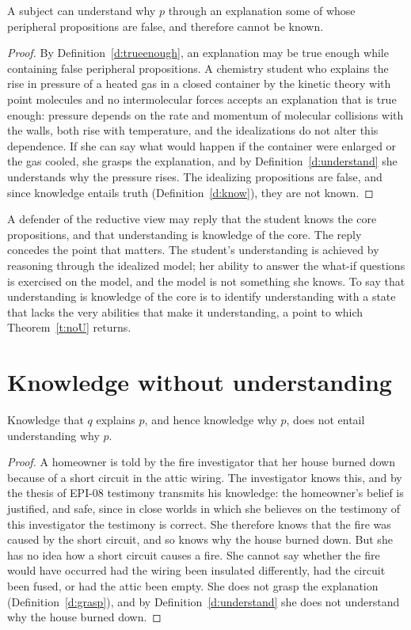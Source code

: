 \documentclass{situationist-preprint}
\begin{document}
\begin{theorem}\label{t:ideal}
A subject can understand why $p$ through an explanation some of whose peripheral propositions are false, and therefore cannot be known.
\end{theorem}

\begin{proof}
By Definition~\ref{d:trueenough}, an explanation may be true enough while containing false peripheral propositions. A chemistry student who explains the rise in pressure of a heated gas in a closed container by the kinetic theory with point molecules and no intermolecular forces accepts an explanation that is true enough: pressure depends on the rate and momentum of molecular collisions with the walls, both rise with temperature, and the idealizations do not alter this dependence. If she can say what would happen if the container were enlarged or the gas cooled, she grasps the explanation, and by Definition~\ref{d:understand} she understands why the pressure rises. The idealizing propositions are false, and since knowledge entails truth (Definition~\ref{d:know}), they are not known.
\end{proof}

A defender of the reductive view may reply that the student knows the core propositions, and that understanding is knowledge of the core. The reply concedes the point that matters. The student's understanding is achieved by reasoning through the idealized model; her ability to answer the what-if questions is exercised on the model, and the model is not something she knows. To say that understanding is knowledge of the core is to identify understanding with a state that lacks the very abilities that make it understanding, a point to which Theorem~\ref{t:noU} returns.

\section{Knowledge without understanding}

\begin{theorem}\label{t:noU}
Knowledge that $q$ explains $p$, and hence knowledge why $p$, does not entail understanding why $p$.
\end{theorem}

\begin{proof}
A homeowner is told by the fire investigator that her house burned down because of a short circuit in the attic wiring. The investigator knows this, and by the thesis of EPI-08 testimony transmits his knowledge: the homeowner's belief is justified, and safe, since in close worlds in which she believes on the testimony of this investigator the testimony is correct. She therefore knows that the fire was caused by the short circuit, and so knows why the house burned down. But she has no idea how a short circuit causes a fire. She cannot say whether the fire would have occurred had the wiring been insulated differently, had the circuit been fused, or had the attic been empty. She does not grasp the explanation (Definition~\ref{d:grasp}), and by Definition~\ref{d:understand} she does not understand why the house burned down.
\end{proof}
\end{document}
